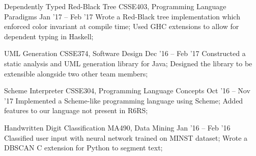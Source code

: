 \documentclass{resume}
\begin{document}
\begin{resumebody}
        \experience
            {Dependently Typed Red-Black Tree}
            {CSSE403, Programming Language Paradigms}
            {Jan '17 -- Feb '17}
            {
                Wrote a Red-Black tree implementation which enforced color invariant at compile time;
                Used GHC extensions to allow for dependent typing in Haskell;
            }

        \experience
            {UML Generation}
            {CSSE374, Software Design}
            {Dec '16 -- Feb '17}
            {
                Constructed a static analysis and UML generation library for Java;
                Designed the library to be extensible alongside two other team members;
            }

        \experience
            {Scheme Interpreter}
            {CSSE304, Programming Language Concepts}
            {Oct '16 -- Nov '17}
            {
                Implemented a Scheme-like programming language using Scheme;
                Added features to our language not present in R6RS;
            }

        \experience
            {Handwritten Digit Classification}
            {MA490, Data Mining}
            {Jan '16 -- Feb '16}
            {
                Classified user input with neural network trained on MINST dataset;
                Wrote a DBSCAN C extension for Python to segment text;
            }




\end{resumebody}
\end{document}
